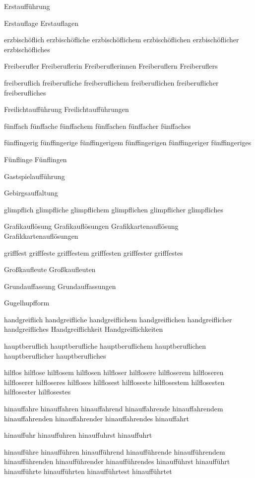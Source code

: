 Erstaufführung

Erstauflage
Erstauflagen

erzbischöflich erzbischöfliche erzbischöflichem erzbischöflichen erzbischöflicher erzbischöfliches

Freiberufler Freiberuflerin Freiberuflerinnen Freiberuflern Freiberuflers

freiberuflich freiberufliche freiberuflichem freiberuflichen freiberuflicher freiberufliches

Freilichtaufführung Freilichtaufführungen

fünffach fünffache fünffachem fünffachen fünffacher fünffaches

fünffingerig fünffingerige fünffingerigem fünffingerigen fünffingeriger fünffingeriges

Fünflinge Fünflingen

Gastspielaufführung

Gebirgsauffaltung

glimpflich glimpfliche glimpflichem glimpflichen glimpflicher glimpfliches

Grafikauflösung Grafikauflösungen Grafikkartenauflösung Grafikkartenauflösungen

grifffest grifffeste grifffestem grifffesten grifffester grifffestes

Großkaufleute Großkaufleuten %

Grundauffassung Grundauffassungen

Gugelhupfform

handgreiflich handgreifliche handgreiflichem handgreiflichen handgreiflicher handgreifliches Handgreiflichkeit Handgreiflichkeiten

hauptberuflich hauptberufliche hauptberuflichem hauptberuflichen hauptberuflicher hauptberufliches

hilflos hilflose hilflosem hilflosen hilfloser hilflosere hilfloserem hilfloseren hilfloserer hilfloseres hilfloses hilflosest hilfloseste hilflosestem hilflosesten hilflosester hilflosestes

hinauffahre hinauffahren hinauffahrend hinauffahrende hinauffahrendem hinauffahrenden hinauffahrender hinauffahrendes hinauffahrt

hinauffuhr hinauffuhren hinauffuhrst hinauffuhrt

hinaufführe hinaufführen hinaufführend hinaufführende hinaufführendem hinaufführenden hinaufführender hinaufführendes hinaufführst hinaufführt hinaufführte hinaufführten hinaufführtest hinaufführtet

